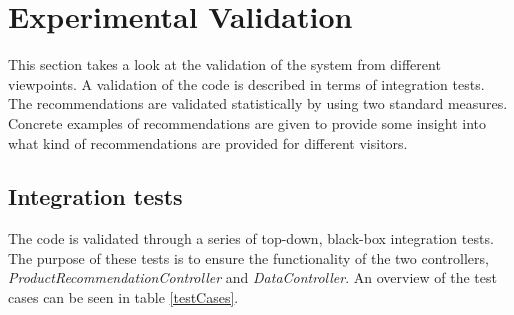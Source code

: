 
\chapter{Experimental Validation} %

\label{Validation} %


This section takes a look at the validation of the system from different viewpoints. A validation of the code is described in terms of integration tests. The recommendations are validated statistically by using two standard measures. Concrete examples of recommendations are given to provide some insight into what kind of recommendations are provided for different visitors.

\section{Integration tests}
The code is validated through a series of top-down, black-box integration tests. The purpose of these tests is to ensure the functionality of the two controllers, \textit{ProductRecommendationController} and \textit{DataController}. An overview of the test cases can be seen in table \ref{testCases}.

